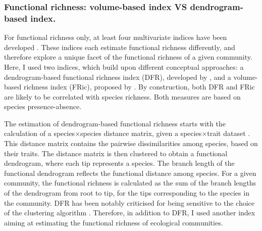 \subsubsection{Functional richness: volume-based index VS dendrogram-based index.}
For functional richness only, at least four multivariate indices have been developed \citep{Legras2018}. These indices each estimate functional richness differently, and therefore explore a unique facet of the functional richness of a given community. Here, I used two indices, which build upon different conceptual approaches: a dendrogram-based functional richness index (DFR), developed by \citet{Petchey2002}, and a volume-based richness index (FRic), proposed by \citet{Villeger2008}. By construction, both DFR and FRic are likely to be correlated with species richness. Both measures are based on species presence-absence.

The estimation of dendrogram-based functional richness starts with the calculation of a species$\times$species distance matrix, given a species$\times$trait dataset \citep{Petchey2002}. This distance matrix contains the pairwise dissimilarities among species, based on their traits. The distance matrix is then clustered to obtain a functional dendrogram, where each tip represents a species. The branch length of the functional dendrogram reflects the functional distance among species. For a given community, the functional richness is calculated as the sum of the branch lengths of the dendrogram from root to tip, for the tips corresponding to the species in the community. DFR has been notably criticised for being sensitive to the choice of the clustering algorithm \citep{Legras2018}. Therefore, in addition to DFR, I used another index aiming at estimating the functional richness of ecological communities. 

